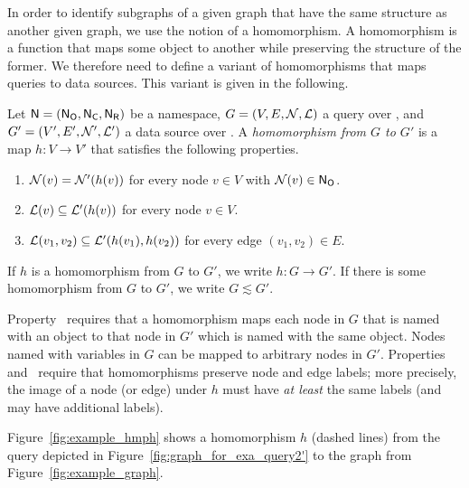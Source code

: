 In order to identify subgraphs of a given graph that have the same structure as another given graph,
we use the notion of a homomorphism.
A homomorphism is a function that maps some object to another
while preserving the structure of the former.
We therefore need to define a variant of homomorphisms that maps queries
to data sources. This variant is given in the following.
%
\begin{definition}
  Let $\textup{\textsf{N}}=(\mathsf{N}_\mathsf{O},\mathsf{N}_\mathsf{C},\mathsf{N}_\mathsf{R})$ be a namespace, $G = (V,E,\mathcal{N},\mathcal{L})$ a query over \namespace,
  and $G' = (V',E',\mathcal{N}',\mathcal{L}')$ a data source over \namespace.
  A \emph{homomorphism from $G$ to $G'$} is a map $h : V \to V'$ that satisfies the following properties.
  \begin{enumerate}
    \item[\hmph{1}]
      $\mathcal{N}(v) = \mathcal{N}'(h(v))$ for every node $v \in V$ with $\mathcal{N}(v) \in \mathsf{N}_\mathsf{O}$.
    \item[\hmph{2}]
      $\mathcal{L}(v) \subseteq \mathcal{L}'(h(v))$ for every node $v \in V$.
    \item[\hmph{3}]
      $\mathcal{L}(v_1, v_2) \subseteq \mathcal{L}'(h(v_1), h(v_2))$
      for every edge $(v_1,v_2) \in E$.
  \end{enumerate}
  If $h$ is a homomorphism from $G$ to $G'$, we write $h : G \to G'$.
  If there is some homomorphism from $G$ to $G'$, we write $G \lesssim G'$.
\end{definition}
%
Property~ requires that a homomorphism maps each node in $G$ that is named with an object
to that node in $G'$ which is named with the same object.
Nodes named with variables in $G$ can be mapped to arbitrary nodes in $G'$.
Properties~ and~ require that homomorphisms preserve node and edge labels;
more precisely, the image of a node (or edge) under $h$ must have \emph{at least}
the same labels (and may have additional labels).

Figure~\ref{fig:example_hmph} shows a homomorphism $h$ (dashed lines)
from the query depicted in Figure~\ref{fig:graph_for_exa_query2'}
to the graph from Figure~\ref{fig:example_graph}.

